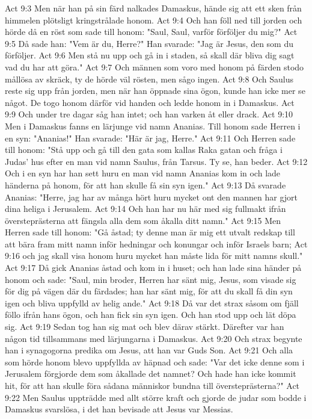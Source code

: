 Act 9:3  Men när han på sin färd nalkades Damaskus, hände sig att ett sken från himmelen plötsligt kringstrålade honom.
Act 9:4  Och han föll ned till jorden och hörde då en röst som sade till honom: "Saul, Saul, varför förföljer du mig?"
Act 9:5  Då sade han: "Vem är du, Herre?" Han svarade: "Jag är Jesus, den som du förföljer.
Act 9:6  Men stå nu upp och gå in i staden, så skall där bliva dig sagt vad du har att göra."
Act 9:7  Och männen som voro med honom på färden stodo mållösa av skräck, ty de hörde väl rösten, men sågo ingen.
Act 9:8  Och Saulus reste sig upp från jorden, men när han öppnade sina ögon, kunde han icke mer se något. De togo honom därför vid handen och ledde honom in i Damaskus.
Act 9:9  Och under tre dagar såg han intet; och han varken åt eller drack.
Act 9:10  Men i Damaskus fanns en lärjunge vid namn Ananias. Till honom sade Herren i en syn: "Ananias!" Han svarade: "Här är jag, Herre."
Act 9:11  Och Herren sade till honom: "Stå upp och gå till den gata som kallas Raka gatan och fråga i Judas' hus efter en man vid namn Saulus, från Tarsus. Ty se, han beder.
Act 9:12  Och i en syn har han sett huru en man vid namn Ananias kom in och lade händerna på honom, för att han skulle få sin syn igen."
Act 9:13  Då svarade Ananias: "Herre, jag har av många hört huru mycket ont den mannen har gjort dina heliga i Jerusalem.
Act 9:14  Och han har nu här med sig fullmakt ifrån översteprästerna att fängsla alla dem som åkalla ditt namn."
Act 9:15  Men Herren sade till honom: "Gå åstad; ty denne man är mig ett utvalt redskap till att bära fram mitt namn inför hedningar och konungar och inför Israels barn;
Act 9:16  och jag skall visa honom huru mycket han måste lida för mitt namns skull."
Act 9:17  Då gick Ananias åstad och kom in i huset; och han lade sina händer på honom och sade: "Saul, min broder, Herren har sänt mig, Jesus, som visade sig för dig på vägen där du färdades; han har sänt mig, för att du skall få din syn igen och bliva uppfylld av helig ande."
Act 9:18  Då var det strax såsom om fjäll föllo ifrån hans ögon, och han fick sin syn igen. Och han stod upp och lät döpa sig.
Act 9:19  Sedan tog han sig mat och blev därav stärkt. Därefter var han någon tid tillsammans med lärjungarna i Damaskus.
Act 9:20  Och strax begynte han i synagogorna predika om Jesus, att han var Guds Son.
Act 9:21  Och alla som hörde honom blevo uppfyllda av häpnad och sade: "Var det icke denne som i Jerusalem förgjorde dem som åkallade det namnet? Och hade han icke kommit hit, för att han skulle föra sådana människor bundna till översteprästerna?"
Act 9:22  Men Saulus uppträdde med allt större kraft och gjorde de judar som bodde i Damaskus svarslösa, i det han bevisade att Jesus var Messias.
